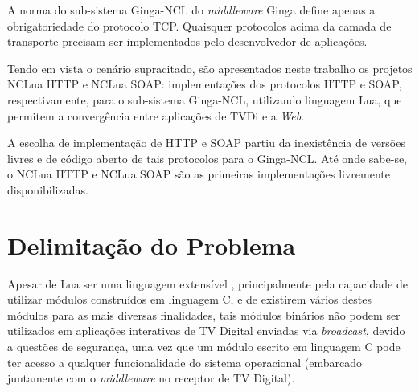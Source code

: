 A norma do sub-sistema Ginga-NCL do \textit{middleware} Ginga define 
apenas a obrigatoriedade do protocolo TCP. Quaisquer protocolos acima da camada de transporte
precisam ser implementados pelo desenvolvedor de aplicações. 

Tendo em vista o cenário supracitado, são apresentados neste trabalho os projetos NCLua HTTP e NCLua SOAP: implementações dos protocolos HTTP e SOAP, respectivamente, para o sub-sistema Ginga-NCL, utilizando linguagem Lua, que permitem a convergência
entre aplicações de TVDi e a \textit{Web}.

A escolha de implementação de HTTP e SOAP partiu da inexistência de versões livres e de código aberto de tais protocolos para o Ginga-NCL.
Até onde sabe-se, o NCLua HTTP e NCLua SOAP são as primeiras implementações livremente disponibilizadas.

\begin{comment}
O artigo está organizado como segue. 
Na Seção \ref{sec:problema} é apresentado o problema de consumo de \textit{Web Services} em aplicações
de TVDi no Ginga-NCL. 
Na Seção \ref{sec:trabs-rel} são apresentadas as tecnologias e trabalhos relacionados.
Na Seção \ref{sec:modulos-implementados} é apresentada a proposta implementada para prover o consumo de \textit{Web Services} em aplicações de TVDi. 
Na Seção \ref{sec:resultados} são apresentados os resultados alcançados e exemplos de utilização dos módulos desenvolvidos.
Na Seção \ref{sec:conclusao} são tecidas as conclusões. Por fim, na Seção \ref{sec:trabalhos-futuros} são esboçados os trabalhos futuros.
\end{comment}

\section{Delimitação do Problema} \label{sec:problema}

Apesar de Lua ser uma linguagem extensível \cite{ierusalimschy2007evolution}, principalmente pela capacidade de utilizar módulos construídos em linguagem C, e de existirem vários destes módulos para as mais diversas finalidades, tais módulos binários não podem ser utilizados em aplicações interativas de TV Digital enviadas via \textit{broadcast}, devido a questões de segurança, uma vez que um módulo escrito em linguagem C pode ter acesso a qualquer funcionalidade do sistema operacional (embarcado juntamente com o \textit{middleware} no receptor de TV Digital). 

